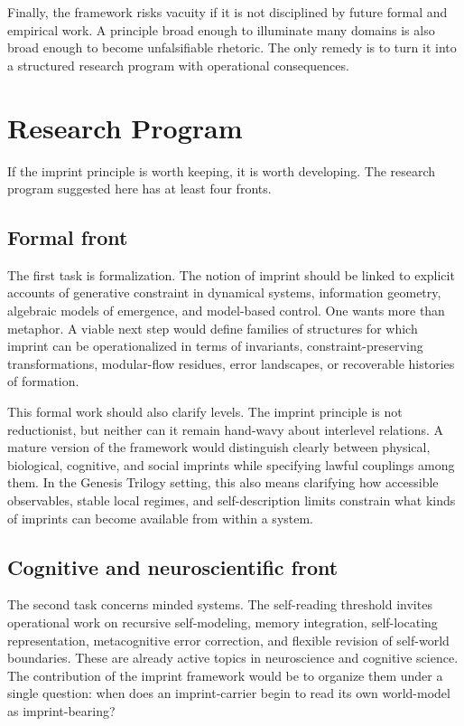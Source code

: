 \documentclass[12pt]{article}
\begin{document}
Finally, the framework risks vacuity if it is not disciplined by future formal and empirical work. A principle broad enough to illuminate many domains is also broad enough to become unfalsifiable rhetoric. The only remedy is to turn it into a structured research program with operational consequences.

\section{Research Program}

If the imprint principle is worth keeping, it is worth developing. The research program suggested here has at least four fronts.

\subsection{Formal front}

The first task is formalization. The notion of imprint should be linked to explicit accounts of generative constraint in dynamical systems, information geometry, algebraic models of emergence, and model-based control. One wants more than metaphor. A viable next step would define families of structures for which imprint can be operationalized in terms of invariants, constraint-preserving transformations, modular-flow residues, error landscapes, or recoverable histories of formation.

This formal work should also clarify levels. The imprint principle is not reductionist, but neither can it remain hand-wavy about interlevel relations. A mature version of the framework would distinguish clearly between physical, biological, cognitive, and social imprints while specifying lawful couplings among them. In the Genesis Trilogy setting, this also means clarifying how accessible observables, stable local regimes, and self-description limits constrain what kinds of imprints can become available from within a system.

\subsection{Cognitive and neuroscientific front}

The second task concerns minded systems. The self-reading threshold invites operational work on recursive self-modeling, memory integration, self-locating representation, metacognitive error correction, and flexible revision of self-world boundaries. These are already active topics in neuroscience and cognitive science. The contribution of the imprint framework would be to organize them under a single question: when does an imprint-carrier begin to read its own world-model as imprint-bearing?
\end{document}
